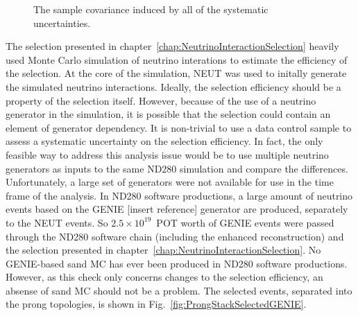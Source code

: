 \begin{figure}%
  \centering
  \caption{The sample covariance induced by all of the systematic uncertainties.}
  \label{fig:TotalCovarianceMatrices}
\end{figure}
\newline
\newline
The selection presented in chapter~\ref{chap:NeutrinoInteractionSelection} heavily used Monte Carlo simulation of neutrino interations to estimate the efficiency of the selection.  At the core of the simulation, NEUT was used to initally generate the simulated neutrino interactions.  Ideally, the selection efficiency should be a property of the selection itself.  However, because of the use of a neutrino generator in the simulation, it is possible that the selection could contain an element of generator dependency.  It is non-trivial to use a data control sample to assess a systematic uncertainty on the selection efficiency.  In fact, the only feasible way to address this analysis issue would be to use multiple neutrino generators as inputs to the same ND280 simulation and compare the differences.  Unfortunately, a large set of generators were not available for use in the time frame of the analysis.  In ND280 software productions, a large amount of neutrino events based on the GENIE [insert reference] generator are produced, separately to the NEUT events.  So $2.5\times 10^{19}$~POT worth of GENIE events were passed through the ND280 software chain (including the enhanced reconstruction) and the selection presented in chapter~\ref{chap:NeutrinoInteractionSelection}.  No GENIE-based sand MC has ever been produced in ND280 software productions.  However, as this check only concerns changes to the selection efficiency, an absense of sand MC should not be a problem.  The selected events, separated into the prong topologies, is shown in Fig.~\ref{fig:ProngStackSelectedGENIE}.
